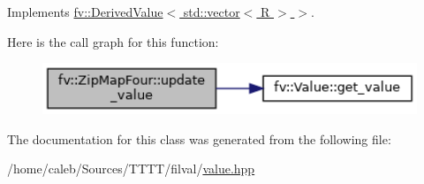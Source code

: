 Implements \hyperlink{classfv_1_1DerivedValue_ae59e80a98eb74b95d8961bfe12ee5ec2}{fv\+::\+Derived\+Value$<$ std\+::vector$<$ R $>$ $>$}.

Here is the call graph for this function\+:
\nopagebreak
\begin{figure}[H]
\begin{center}
\leavevmode
\includegraphics[width=350pt]{classfv_1_1ZipMapFour_a812747fdc043c776951ceb93a1085915_cgraph}
\end{center}
\end{figure}


The documentation for this class was generated from the following file\+:\begin{DoxyCompactItemize}
\item 
/home/caleb/\+Sources/\+T\+T\+T\+T/filval/\hyperlink{value_8hpp}{value.\+hpp}\end{DoxyCompactItemize}

